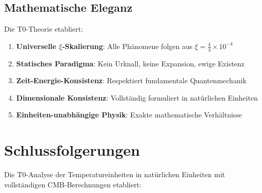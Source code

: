 \documentclass[12pt,a4paper]{article}
\theoremstyle{definition}
\theoremstyle{remark}
\begin{document}
	\subsection{Mathematische Eleganz}
	
	Die T0-Theorie etabliert:
	\begin{enumerate}
		\item \textbf{Universelle $\xi$-Skalierung}: Alle Ph\"anomene folgen aus $\xi = \frac{4}{3} \times 10^{-4}$
		\item \textbf{Statisches Paradigma}: Kein Urknall, keine Expansion, ewige Existenz
		\item \textbf{Zeit-Energie-Konsistenz}: Respektiert fundamentale Quantenmechanik
		\item \textbf{Dimensionale Konsistenz}: Vollst\"andig formuliert in nat\"urlichen Einheiten
		\item \textbf{Einheiten-unabh\"angige Physik}: Exakte mathematische Verh\"altnisse
	\end{enumerate}
	
	\section{Schlussfolgerungen}
	
	Die T0-Analyse der Temperatureinheiten in nat\"urlichen Einheiten mit vollst\"andigen CMB-Berechnungen etabliert:
	
\end{document}
